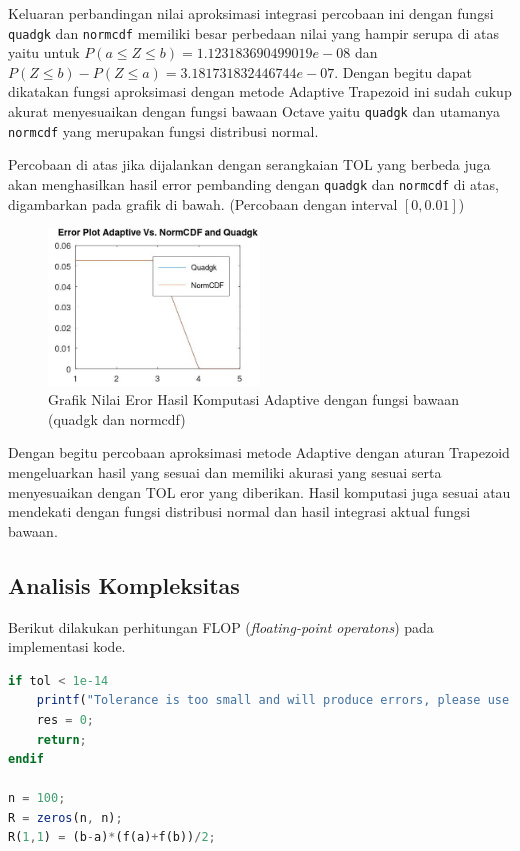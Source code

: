 \documentclass[journal,12pt,onecolumn,a4paper]{IEEEtran}
\begin{document}
Keluaran perbandingan nilai aproksimasi integrasi percobaan ini dengan fungsi \lstinline{quadgk} dan \lstinline{normcdf} memiliki besar perbedaan nilai
yang hampir serupa di atas yaitu untuk \(P(a \le Z \le b)= 1.123183690499019e-08\)  dan \(P(Z \le b ) - P(Z \le a ) = 3.181731832446744e-07\).
Dengan begitu dapat dikatakan fungsi aproksimasi dengan metode
Adaptive Trapezoid ini sudah cukup akurat menyesuaikan dengan fungsi bawaan Octave yaitu \lstinline{quadgk} dan utamanya \lstinline{normcdf} yang merupakan fungsi distribusi normal.

Percobaan di atas jika dijalankan dengan serangkaian TOL yang berbeda juga akan menghasilkan hasil error pembanding dengan \lstinline{quadgk} dan \lstinline{normcdf} di atas, digambarkan pada grafik di bawah.
(Percobaan dengan interval \([0,0.01]\))
\begin{figure}[h]
	\centering
	\includegraphics[width=0.5\textwidth]{trapezoid graf.jpg}
	\caption{Grafik Nilai Eror Hasil Komputasi Adaptive dengan fungsi bawaan (quadgk dan normcdf)}
	\label{fig:difGraphAdaptive}
\end{figure}

Dengan begitu percobaan aproksimasi metode Adaptive dengan aturan Trapezoid mengeluarkan hasil yang sesuai dan memiliki akurasi yang sesuai serta menyesuaikan dengan TOL eror yang diberikan. Hasil komputasi juga sesuai atau mendekati dengan fungsi distribusi normal dan hasil integrasi aktual fungsi bawaan.

\subsection{Analisis Kompleksitas}
Berikut dilakukan perhitungan FLOP (\emph{floating-point operatons}) pada implementasi kode.

\begin{center}
	\begin{lstlisting}[language=Octave]
if tol < 1e-14
	printf("Tolerance is too small and will produce errors, please use larger values\n")
	res = 0;
	return;
endif

n = 100;
R = zeros(n, n);
R(1,1) = (b-a)*(f(a)+f(b))/2;
	\end{lstlisting}
\end{center}
\end{document}
